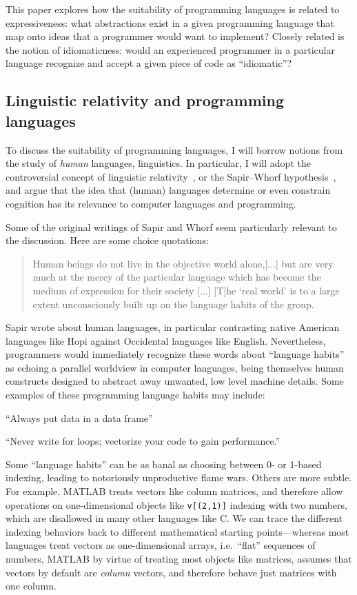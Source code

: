 \documentclass[11pt]{asaproc}
\begin{document}
This paper explores how the suitability of programming languages is related to
expressiveness: what abstractions exist in a given programming language that
map onto ideas that a programmer would want to implement? Closely related is
the notion of idiomaticness: would an experienced programmer in a particular
language recognize and accept a given piece of code as ``idiomatic''?



\subsection{Linguistic relativity and programming languages}

To discuss the suitability of programming languages, I will borrow notions from
the study of \textit{human} languages, linguistics. In particular, I will adopt
the controversial concept of linguistic relativity~\citep{Gumperz1996}, or the
Sapir--Whorf hypothesis~\citep{Brown1976}, and argue that the idea that (human)
languages determine or even constrain cognition has its relevance to computer
languages and programming.

Some of the original writings of Sapir and Whorf seem particularly relevant to
the discussion. Here are some choice quotations:

\begin{quotation}
Human beings do not live in the objective world alone,[...] but are very much
at the mercy of the particular language which has become the medium of
expression for their society [...] [T]he `real world' is to a large extent
unconsciously built up on the language habits of the group.~\citep{Sapir1929}
\end{quotation}

Sapir wrote about human languages, in particular contrasting native American
languages like Hopi against Occidental languages like English. Nevertheless,
programmers would immediately recognize these words about ``language habits''
as echoing a parallel worldview in computer languages, being themselves human
constructs designed to abstract away unwanted, low level machine details.
Some examples of these programming language habits may include:

``Always put data in a data frame''

``Never write for loops; vectorize your code to gain performance.''

Some ``language habits'' can be as banal as choosing between 0- or 1-based
indexing, leading to notoriously unproductive flame wars.  Others are more
subtle. For example, MATLAB treats vectors like column matrices, and therefore
allow operations on one-dimensional objects like \lstinline|v[(2,1)]| indexing
with two numbers, which are disallowed in many other languages like C. We can
trace the different indexing behaviors back to different mathematical starting
points---whereas most languages treat vectors as one-dimensional arrays, i.e.\
``flat'' sequences of numbers, MATLAB by virtue of treating most objects like
matrices, assumes that vectors by default are \textit{column} vectors, and
therefore behave just matrices with one column.
\end{document}
